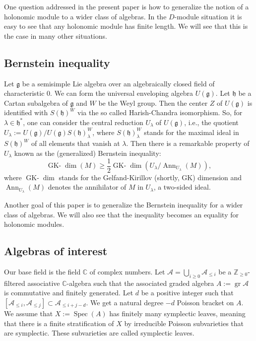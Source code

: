 \documentclass[12pt]{amsart}
\newcommand{\A}{\mathcal{A}}
\newcommand{\K}{\mathbb{C}}
\newcommand{\Z}{\mathbb{Z}}
\newcommand{\gr}{\operatorname{gr}}
\newcommand{\g}{\mathfrak{g}}
\newcommand{\h}{\mathfrak{h}}
\theoremstyle{definition}
\begin{document}
One question addressed in the present paper  is how to generalize the notion of a holonomic
module to a wider class of algebras. In the $D$-module situation it is easy to see
that any holonomic module has finite length. We will see that this is the case in
many other situations.

\subsection{Bernstein inequality}\label{SS_Bernstein_ineq}
Let $\g$ be a semisimple Lie algebra over an algebraically closed field of characteristic $0$.
We can form the universal enveloping algebra $U(\g)$. Let $\h$ be a Cartan subalgebra
of $\g$ and $W$ be the Weyl group. Then the center $Z$ of $U(\g)$ is identified
with $S(\h)^W$ via the so called Harish-Chandra isomorphism. So, for $\lambda\in \h^*$,
one can consider the central reduction $U_\lambda$ of $U(\g)$, i.e., the quotient
$U_\lambda:=U(\g)/U(\g)S(\h)^W_\lambda$, where $S(\h)^W_\lambda$ stands for the maximal ideal in
$S(\h)^W$ of all elements that vanish at $\lambda$. Then there is a remarkable property of
$U_\lambda$ known as the (generalized) Bernstein inequality: $$\operatorname{GK-}\dim(M)\geqslant
\frac{1}{2} \operatorname{GK-}\dim \left(U_\lambda/\operatorname{Ann}_{U_\lambda}(M)\right),$$
where $\operatorname{GK-}\dim$ stands for the Gelfand-Kirillov (shortly, GK) dimension and $\operatorname{Ann}_{U_\lambda}(M)$
denotes the annihilator of $M$ in $U_\lambda$, a two-sided ideal.

Another goal of this paper is to generalize the Bernstein inequality for a wider class of algebras.
We will also see  that the inequality becomes an equality for holonomic modules.

\subsection{Algebras of interest}\label{SS_alg}
Our base field is the field $\K$ of complex numbers. Let $\A=\bigcup_{i\geqslant 0}\A_{\leqslant i}$ be a $\Z_{\geqslant 0}$-filtered associative $\K$-algebra such that  the associated graded algebra $A:=\gr\A$ is commutative and finitely generated. Let $d$ be a positive integer such that $[\A_{\leqslant i},\A_{\leqslant j}]\subset \A_{\leqslant i+j-d}$. We get a natural degree $-d$ Poisson bracket on $A$. We assume that $X:=\operatorname{Spec}(A)$ has finitely many symplectic leaves, meaning that there is a finite stratification of $X$ by irreducible Poisson subvarieties that are symplectic. These subvarieties are called symplectic leaves.
\end{document}
